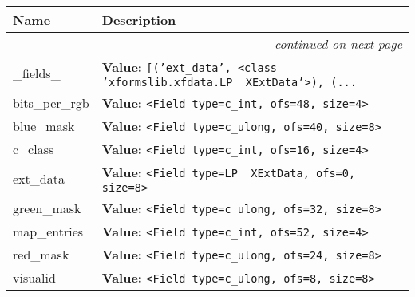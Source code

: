     \vspace{-1cm}
\hspace{\varindent}\begin{longtable}{|p{\varnamewidth}|p{\vardescrwidth}|l}
\cline{1-2}
\cline{1-2} \centering \textbf{Name} & \centering \textbf{Description}& \\
\cline{1-2}
\endhead\cline{1-2}\multicolumn{3}{r}{\small\textit{continued on next page}}\\\endfoot\cline{1-2}
\endlastfoot\raggedright \_\-f\-i\-e\-l\-d\-s\-\_\- & \raggedright \textbf{Value:} 
{\tt \texttt{[}\texttt{(}\texttt{'}\texttt{ext\_data}\texttt{'}\texttt{, }{\textless}class 'xformslib.xfdata.LP\_\_XExtData'{\textgreater}\texttt{)}\texttt{, }\texttt{(}\texttt{...}}&\\
\cline{1-2}
\raggedright b\-i\-t\-s\-\_\-p\-e\-r\-\_\-r\-g\-b\- & \raggedright \textbf{Value:} 
{\tt {\textless}Field type=c\_int, ofs=48, size=4{\textgreater}}&\\
\cline{1-2}
\raggedright b\-l\-u\-e\-\_\-m\-a\-s\-k\- & \raggedright \textbf{Value:} 
{\tt {\textless}Field type=c\_ulong, ofs=40, size=8{\textgreater}}&\\
\cline{1-2}
\raggedright c\-\_\-c\-l\-a\-s\-s\- & \raggedright \textbf{Value:} 
{\tt {\textless}Field type=c\_int, ofs=16, size=4{\textgreater}}&\\
\cline{1-2}
\raggedright e\-x\-t\-\_\-d\-a\-t\-a\- & \raggedright \textbf{Value:} 
{\tt {\textless}Field type=LP\_\_XExtData, ofs=0, size=8{\textgreater}}&\\
\cline{1-2}
\raggedright g\-r\-e\-e\-n\-\_\-m\-a\-s\-k\- & \raggedright \textbf{Value:} 
{\tt {\textless}Field type=c\_ulong, ofs=32, size=8{\textgreater}}&\\
\cline{1-2}
\raggedright m\-a\-p\-\_\-e\-n\-t\-r\-i\-e\-s\- & \raggedright \textbf{Value:} 
{\tt {\textless}Field type=c\_int, ofs=52, size=4{\textgreater}}&\\
\cline{1-2}
\raggedright r\-e\-d\-\_\-m\-a\-s\-k\- & \raggedright \textbf{Value:} 
{\tt {\textless}Field type=c\_ulong, ofs=24, size=8{\textgreater}}&\\
\cline{1-2}
\raggedright v\-i\-s\-u\-a\-l\-i\-d\- & \raggedright \textbf{Value:} 
{\tt {\textless}Field type=c\_ulong, ofs=8, size=8{\textgreater}}&\\
\cline{1-2}
\end{longtable}


